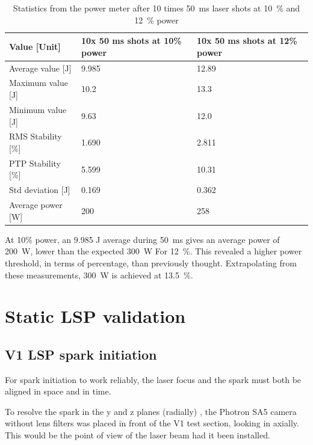             \begin{table}[!ht]
                \caption{Statistics from the power meter after 10 times \qty{50}{ms} laser shots at \qty{10}{\%} and \qty{12}{\%} power}
                \label{tab:laser shot statistics}
                \begin{tabular}{lll}
                \textbf{Value {[}Unit{]}} & \textbf{10x 50 ms shots at 10\% power} & \textbf{10x 50 ms shots at 12\% power} \\ \hline
                Average value {[}J{]}  & 9.985 & 12.89 \\
                Maximum value {[}J{]}  & 10.2  & 13.3  \\
                Minimum value {[}J{]}  & 9.63  & 12.0  \\
                RMS Stability {[}\%{]} & 1.690 & 2.811 \\
                PTP Stability {[}\%{]} & 5.599 & 10.31 \\
                Std deviation {[}J{]}  & 0.169 & 0.362 \\
                Average power {[}W{]}  & 200 & 258  \\ \hline
                \end{tabular}
            \end{table}
            
            At 10\% power, an 9.985 J average during \qty{50}{ms} gives an average power of \qty{200}{W}, lower than the expected \qty{300}{W} For \qty{12}{\%}. This revealed a higher power threshold, in terms of percentage, than previously thought. Extrapolating from these measurements, \qty{300}{W} is achieved at \qty{13.5}{\%}.

    \section{Static LSP validation}

        \subsection{V1 LSP spark initiation}

            For spark initiation to work reliably, the laser focus and the spark must both be aligned in space and in time.

            To resolve the spark in the y and z planes (radially) , the Photron SA5 camera without lens filters was placed in front of the V1 test section, looking in axially. This would be the point of view of the laser beam had it been installed. 

